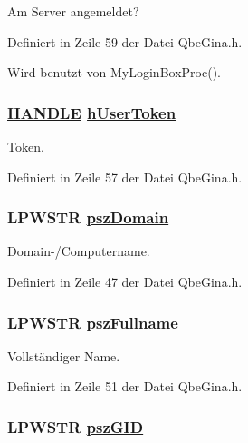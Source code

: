Am Server angemeldet? 



Definiert in Zeile 59 der Datei Qbe\-Gina.h.

Wird benutzt von My\-Login\-Box\-Proc().\hypertarget{structQbeGina__AccountInfo_QbeGina__AccountInfoo6}{
\subsubsection[hUserToken]{\setlength{\rightskip}{0pt plus 5cm}\hyperlink{QbeGina_8h_a0}{HANDLE} \hyperlink{structQbeGina__AccountInfo_QbeGina__AccountInfoo6}{h\-User\-Token}}}
\label{structQbeGina__AccountInfo_QbeGina__AccountInfoo6}


Token. 



Definiert in Zeile 57 der Datei Qbe\-Gina.h.\hypertarget{structQbeGina__AccountInfo_QbeGina__AccountInfoo1}{
\subsubsection[pszDomain]{\setlength{\rightskip}{0pt plus 5cm}LPWSTR \hyperlink{structQbeGina__AccountInfo_QbeGina__AccountInfoo1}{psz\-Domain}}}
\label{structQbeGina__AccountInfo_QbeGina__AccountInfoo1}


Domain-/Computername. 



Definiert in Zeile 47 der Datei Qbe\-Gina.h.\hypertarget{structQbeGina__AccountInfo_QbeGina__AccountInfoo3}{
\subsubsection[pszFullname]{\setlength{\rightskip}{0pt plus 5cm}LPWSTR \hyperlink{structQbeGina__AccountInfo_QbeGina__AccountInfoo3}{psz\-Fullname}}}
\label{structQbeGina__AccountInfo_QbeGina__AccountInfoo3}


Vollst\"{a}ndiger Name. 



Definiert in Zeile 51 der Datei Qbe\-Gina.h.\hypertarget{structQbeGina__AccountInfo_QbeGina__AccountInfoo5}{
\subsubsection[pszGID]{\setlength{\rightskip}{0pt plus 5cm}LPWSTR \hyperlink{structQbeGina__AccountInfo_QbeGina__AccountInfoo5}{psz\-GID}}}
\label{structQbeGina__AccountInfo_QbeGina__AccountInfoo5}


